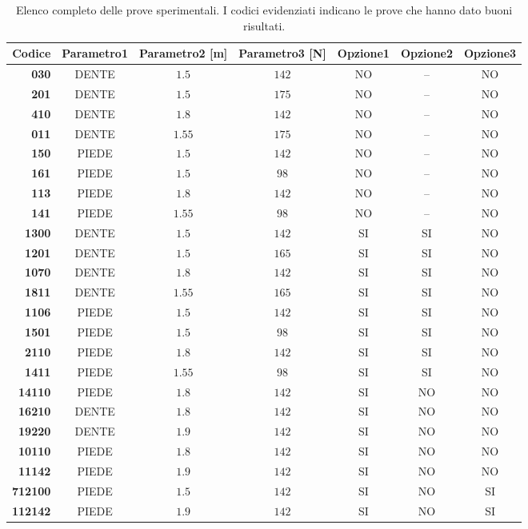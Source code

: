 \begin{sidewaystable}
%
\caption[Elenco completo delle prove sperimentali]{Elenco completo delle prove sperimentali. I {\color{webbrown} codici evidenziati} indicano le prove che hanno dato buoni risultati.}
%
\label{tab:sidewaystable}
%
\centering
%
\begin{tabular}{>{\bfseries}r c c c c c c}
%
\toprule
%
\textbf{Codice} & %
	\textbf{Parametro1}	& \textbf{Parametro2 [m]}	 & \textbf{Parametro3 [N]} %
							& \textbf{Opzione1} %
									& \textbf{Opzione2} %
											& \textbf{Opzione3}\\ 
%
\midrule
%
030  	& DENTE		& $1.5$		& $142$ 	& NO	& --	& NO\\ 
%
{\color{webbrown} 201}  	& DENTE		& $1.5$		& $175$ 	& NO	& --	& NO\\ 
%
410  	& DENTE		& $1.8$		& $142$ 	& NO	& --	& NO\\ 
%
{\color{webbrown} 011}  	& DENTE		& $1.55$		& $175$ 	& NO	& --	& NO\\ 
%
150  	& PIEDE		& $1.5$		& $142$ 	& NO	& --	& NO\\ 
%
{\color{webbrown} 161}  	& PIEDE		& $1.5$		& $98$ 	& NO	& --	& NO\\ 
%
113 	& PIEDE		& $1.8$		& $142$ 	& NO	& --	& NO\\ 
%
{\color{webbrown} 141}  	& PIEDE		& $1.55$		& $98$ 	& NO	& --	& NO\\ 
%
\midrule
%
{\color{webbrown} 1300}  	& DENTE		& $1.5$		& $142$ 		& SI 	& SI 	& NO\\
%
1201  	& DENTE		& $1.5$		& $165$ 		& SI 	& SI 	& NO\\
%
{\color{webbrown} 1070}  	& DENTE		& $1.8$		& $142$ 		& SI 	& SI 	& NO\\
%
1811  	& DENTE		& $1.55$		& $165$ 		& SI 	& SI 	& NO\\
%
{\color{webbrown} 1106}  	& PIEDE		& $1.5$		& $142$ 		& SI 	& SI 	& NO\\
%
1501  	& PIEDE		& $1.5$		& $98$ 		& SI 	& SI 	& NO\\
%
{\color{webbrown} 2110}  	& PIEDE		& $1.8$		& $142$ 		& SI 	& SI 	& NO\\
%
1411  	& PIEDE		& $1.55$		& $98$ 		& SI 	& SI 	& NO\\
%
\midrule
%
14110  	& PIEDE		& $1.8$		& $142$ 		& SI 	& NO 	& NO\\
%
16210  	& DENTE		& $1.8$		& $142$ 		& SI 	& NO 	& NO\\
%
19220  	& DENTE		& $1.9$		& $142$ 		& SI 	& NO 	& NO\\
%
10110  	& PIEDE		& $1.8$		& $142$ 		& SI 	& NO 	& NO\\
%
11142  	& PIEDE		& $1.9$		& $142$ 		& SI 	& NO 	& NO\\
%
\midrule
%
{\color{webbrown} 712100}  	& PIEDE		& $1.5$		& $142$ 		& SI 	& NO	& SI\\
%
112142  	& PIEDE		& $1.9$		& $142$ 		& SI 	& NO	& SI\\
%
\bottomrule 
%
\end{tabular}
%
\end{sidewaystable}
%
